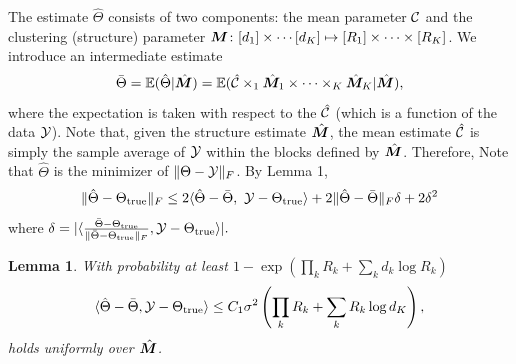 \documentclass{article}
\newtheorem{lemma}{Lemma}
\newcommand*{\KeepStyleUnderBrace}[1]{%
  \mathop{%
    \mathchoice
    {\underbrace{\displaystyle#1}}%
    {\underbrace{\textstyle#1}}%
    {\underbrace{\scriptstyle#1}}%
    {\underbrace{\scriptscriptstyle#1}}%
  }\limits
}
\begin{document}
\begin{appendices}
The estimate $\hat \Theta$ consists of two components: the mean parameter $\mathcal{C}$ and the clustering (structure) parameter $ \bm M\colon [d_1]\times \cdots [d_K]\mapsto [R_1]\times \cdots \times [R_K]$. We introduce an intermediate estimate 
\[
\bar \Theta =\mathbb{E}(\hat \Theta|\hat {\bm M})=\mathbb{E}(\hat {\mathcal{C}}\times_1 \hat {\bm M}_1\times\cdots \times_K \hat {\bm M}_K|\hat {\bm M}),
\] 
where the expectation is taken with respect to the $\hat {\mathcal{C}}$ (which is a function of the data $\mathcal{Y}$). Note that, given the structure estimate $\hat {\bm M}$, the mean estimate $\hat {\mathcal{C}}$ is simply the sample average of $\mathcal{Y}$ within the blocks defined by $\hat {\bm M}$. Therefore, 
Note that $\hat \Theta$ is the minimizer of $\lVert\Theta -\mathcal{Y}\rVert_F$. By Lemma 1, 
\[
\lVert\hat \Theta -\Theta_{\text{true}}\rVert_F\leq 2 \langle \hat \Theta-\bar\Theta,\ \mathcal{Y}-\Theta_{\text{true}} \rangle+2\lVert\hat \Theta-\bar\Theta\rVert_F \delta +2 \delta^2
\]
where $\delta=|\langle {\bar \Theta -\Theta_{\text{true}}\over  \lVert\bar \Theta-\Theta_{\text{true}}\rVert_F}, \mathcal{Y}-\Theta_{\text{true}}  \rangle|.$

\begin{lemma} With probability at least $1-\exp(\prod_k R_k + \sum_k d_k \log R_k)$
\[
\langle\hat \Theta -\bar \Theta, \mathcal{Y}-\Theta_{\text{true}}\rangle\leq C_1\sigma^2 \left( \prod_k R_k+\sum_k R_k\log d_K\right),
\]
holds uniformly over $\hat {\bm M}$. 
\end{lemma}


\end{appendices}
\end{document}
